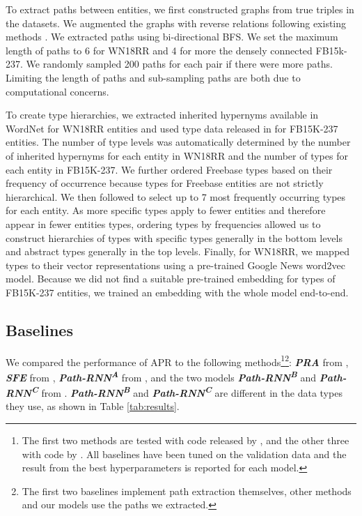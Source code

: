\documentclass[letterpaper]{article} %
\begin{document}
To extract paths between entities, we first constructed graphs from true triples in the datasets. We augmented the graphs with reverse relations following existing methods \cite{pra}. We extracted paths using bi-directional BFS. We set the maximum length of paths to 6 for WN18RR and 4 for more the densely connected FB15k-237. We randomly sampled 200 paths for each pair if there were more paths. Limiting the length of paths and sub-sampling paths are both due to computational concerns.

To create type hierarchies, we extracted inherited hypernyms available in WordNet \cite{wordnet} for WN18RR entities and used type data released in \cite{fb_types} for FB15K-237 entities. The number of type levels was automatically determined by the number of inherited hypernyms for each entity in WN18RR and the number of types for each entity in FB15K-237. We further ordered Freebase types based on their frequency of occurrence because types for Freebase entities are not strictly hierarchical. We then followed \cite{chains} to select up to 7 most frequently occurring types for each entity. As more specific types apply to fewer entities and therefore appear in fewer entities types, ordering types by frequencies allowed us to construct hierarchies of types with specific types generally in the bottom levels and abstract types generally in the top levels. Finally, for WN18RR, we mapped types to their vector representations using a pre-trained Google News word2vec model. Because we did not find a suitable pre-trained embedding for types of FB15K-237 entities, we trained an embedding with the whole model end-to-end.

\subsection{Baselines}
We compared the performance of APR to the following  methods\footnote{The first two methods are tested with code released by \citeauthor{sfe}, and the other three with code by \citeauthor{chains}. All baselines have been tuned on the validation data and the result from the best hyperparameters is reported for each model.}\footnote{The first two baselines implement path extraction themselves, other methods and our models use the paths we extracted.}: \textit{\textbf{PRA}} from \cite{pra}, \textit{\textbf{SFE}} from \cite{sfe}, \textit{\textbf{Path-RNN\textsuperscript{A}}} from \cite{cvsm}, and the two models \textit{\textbf{Path-RNN\textsuperscript{B}}} and \textit{\textbf{Path-RNN\textsuperscript{C}}} from \cite{chains}. \textit{\textbf{Path-RNN\textsuperscript{B}}} and \textit{\textbf{Path-RNN\textsuperscript{C}}} are different in the data types they use, as shown in Table \ref{tab:results}.
\end{document}
